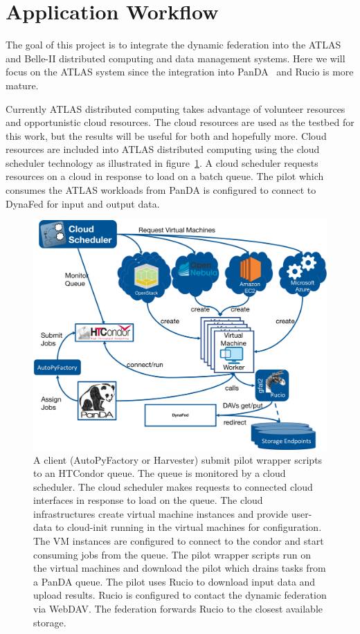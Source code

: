 \documentclass[a4paper]{jpconf}
\begin{document}
\section{Application Workflow}
The goal of this project is to integrate the dynamic federation into the ATLAS and Belle-II distributed computing and data management systems. Here we will focus on the ATLAS system since the integration into PanDA~\cite{panda} and Rucio is more mature.

Currently ATLAS distributed computing takes advantage of volunteer resources~\cite{boinc} and opportunistic cloud resources. The cloud resources are used as the testbed for this work, but the results will be useful for both and hopefully more. Cloud resources are included into ATLAS distributed computing using the cloud scheduler technology as illustrated in figure~\ref{fig:atlas-cloud}. A cloud scheduler requests resources on a cloud in response to load on a batch queue. The pilot which consumes the ATLAS workloads from PanDA is configured to connect to DynaFed for input and output data.

\begin{figure}
  \includegraphics[width=\textwidth]{atlas-cloud-system.png}
  \caption{A client (AutoPyFactory or Harvester) submit pilot wrapper scripts to an HTCondor queue. The queue is monitored by a cloud scheduler. The cloud scheduler makes requests to connected cloud interfaces in response to load on the queue. The cloud infrastructures create virtual machine instances and provide user-data to cloud-init running in the virtual machines for configuration. The VM instances are configured to connect to the condor and start consuming jobs from the queue. The pilot wrapper scripts run on the virtual machines and download the pilot which drains tasks from a PanDA queue. The pilot uses Rucio to download input data and upload results. Rucio is configured to contact the dynamic federation via WebDAV. The federation forwards Rucio to the closest available storage.}
  \label{fig:atlas-cloud}
\end{figure}
\end{document}
